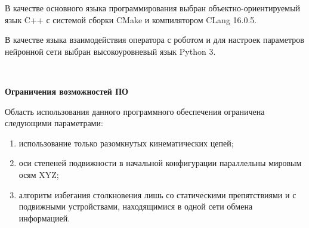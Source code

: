 В качестве основного языка программирования выбран объектно-ориентируемый язык C++ с системой сборки CMake и компилятором CLang 16.0.5.

В качестве языка взаимодействия оператора с роботом и для настроек параметров нейронной сети выбран высокоуровневый язык Python 3.

~

\textbf{Ограничения возможностей ПО}

Область использования данного программного обеспечения ограничена следующими параметрами:

\begin{enumerate}[label =  \arabic*)]
    \item использование только разомкнутых кинематических цепей;
    \item оси степеней подвижности в начальной конфигурации параллельны мировым осям XYZ;
    \item алгоритм избегания столкновения лишь со статическими препятствиями и с подвижными устройствами, находящимися в одной сети обмена информацией.
\end{enumerate}